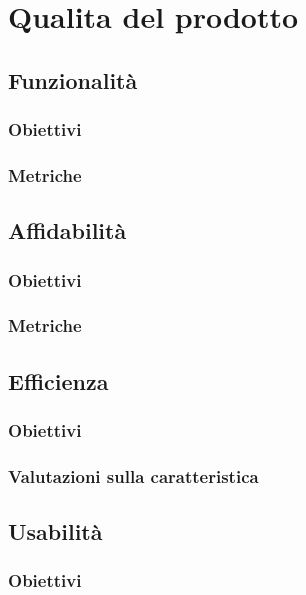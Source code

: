 \section{Qualita del prodotto}

\subsection{Funzionalità}

\subsubsection{Obiettivi}

\subsubsection{Metriche}


\subsection{Affidabilità}

\subsubsection{Obiettivi}

\subsubsection{Metriche}


\subsection{Efficienza}

\subsubsection{Obiettivi}

\subsubsection{Valutazioni sulla caratteristica}


\subsection{Usabilità}

\subsubsection{Obiettivi}

